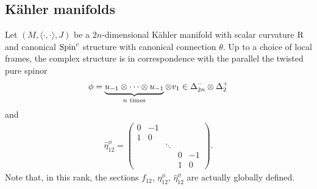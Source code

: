 \documentclass[pdftex]{sigma}
\numberwithin{equation}{section}
\begin{document}
\subsection{K\"ahler manifolds}
Let $(M,\langle \cdot,\cdot\rangle , J)$ be a $2n$-dimensional K\"ahler manifold with scalar curvature ${\rm R}$ and canonical ${\rm Spin}^c$ structure with canonical connection $\theta$. Up to a choice of local frames, the complex structure is in correspondence with the parallel the twisted pure spinor
\begin{gather*}\phi=\underbrace{u_{-1}\otimes\cdots \otimes u_{-1}}_{n\,\, {\rm times}}\otimes v_{1}\in \Delta_{2n}^-\otimes \Delta_2^+\end{gather*}
and
\begin{gather*}
 \hat\eta_{12}^{\phi} = \left(\begin{matrix}
 0 & -1 & & & \\
 1 & 0 & & & \\
 & & \ddots & & \\
 & & & 0 & -1 \\
 & & & 1 & 0
 \end{matrix} \right).
\end{gather*}
Note that, in this rank, the sections $f_{12}$, $\eta_{12}^\phi$, $\hat\eta_{12}^\phi$ are actually globally defined.
\end{document}
